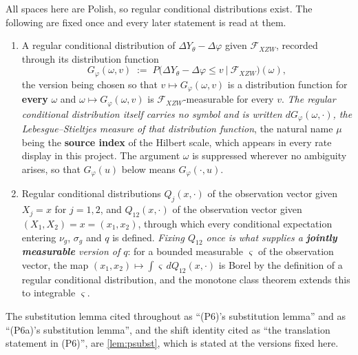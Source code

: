 \begin{definition}\label{def:pregver}
All spaces here are Polish, so regular conditional distributions exist. The following are fixed once and
every later statement is read at them.
\begin{enumerate}
\item[\textup{(P6a)}] A regular conditional distribution of $\Delta Y_\theta-\Delta\varphi$ given
$\mathcal F_{XZW}$, recorded through its distribution function
\[
G_\varphi(\omega,v)\;:=\;P\big(\Delta Y_\theta-\Delta\varphi\le v\ \big|\ \mathcal F_{XZW}\big)(\omega),
\]
the version being chosen so that $v\mapsto G_\varphi(\omega,v)$ is a distribution function for
\textbf{every} $\omega$ and $\omega\mapsto G_\varphi(\omega,v)$ is $\mathcal F_{XZW}$-measurable for every
$v$. \emph{The regular conditional distribution itself carries no symbol and is written
$dG_\varphi(\omega,\cdot)$, the Lebesgue--Stieltjes measure of that distribution function}, the
natural name $\mu$ being the \textbf{source index} of the Hilbert scale, which appears in every rate
display in this
project. The argument $\omega$ is suppressed wherever no ambiguity arises, so that $G_\varphi(u)$
below means $G_\varphi(\cdot,u)$.
\item[\textup{(P6b)}] Regular conditional distributions $Q_j(x,\cdot)$ of the observation vector given
$X_j=x$ for $j=1,2$, and $Q_{12}(x,\cdot)$ of the observation vector given $(X_1,X_2)=x=(x_1,x_2)$,
through which every conditional expectation entering $\nu_g$, $\sigma_g$ and $q$ is defined. \emph{Fixing
$Q_{12}$ once is what supplies a \textbf{jointly measurable} version of $q$}: for a bounded measurable
$\varsigma$ of the observation vector, the map
$(x_1,x_2)\mapsto\int\varsigma\,dQ_{12}(x,\cdot)$ is Borel by the definition of a regular conditional
distribution, and the monotone class theorem extends this to integrable $\varsigma$.
\end{enumerate}
The substitution lemma cited throughout as ``\textup{(P6)}'s substitution lemma'' and as
``\textup{(P6a)}'s substitution lemma'', and the shift identity cited as ``the translation statement in
\textup{(P6)}'', are \cref{lem:psubst}, which is stated at the versions fixed here.
\end{definition}

